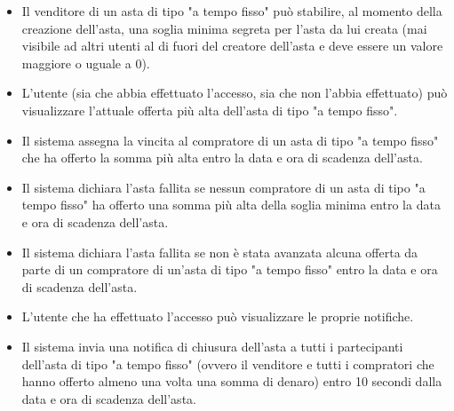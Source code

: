         \begin{itemize}
            \item Il venditore di un asta di tipo "a tempo fisso" può stabilire, al momento della creazione dell'asta, una soglia minima segreta per l'asta da lui creata (mai visibile ad altri utenti al di fuori del creatore dell'asta e deve essere un valore maggiore o uguale a 0).
            \item L'utente (sia che abbia effettuato l'accesso, sia che non l'abbia effettuato) può visualizzare l'attuale offerta più alta dell'asta di tipo "a tempo fisso".
            \item Il sistema assegna la vincita al compratore di un asta di tipo "a tempo fisso" che ha offerto la somma più alta entro la data e ora di scadenza dell'asta.
            \item Il sistema dichiara l'asta fallita se nessun compratore di un asta di tipo "a tempo fisso" ha offerto una somma più alta della soglia minima entro la data e ora di scadenza dell'asta.
            \item Il sistema dichiara l'asta fallita se non è stata avanzata alcuna offerta da parte di un compratore di un'asta di tipo "a tempo fisso" entro la data e ora di scadenza dell'asta.
            \item L'utente che ha effettuato l'accesso può visualizzare le proprie notifiche.
            \item Il sistema invia una notifica di chiusura dell'asta a tutti i partecipanti dell'asta di tipo "a tempo fisso" (ovvero il venditore e tutti i compratori che hanno offerto almeno una volta una somma di denaro) entro 10 secondi dalla data e ora di scadenza dell'asta.
        \end{itemize}
